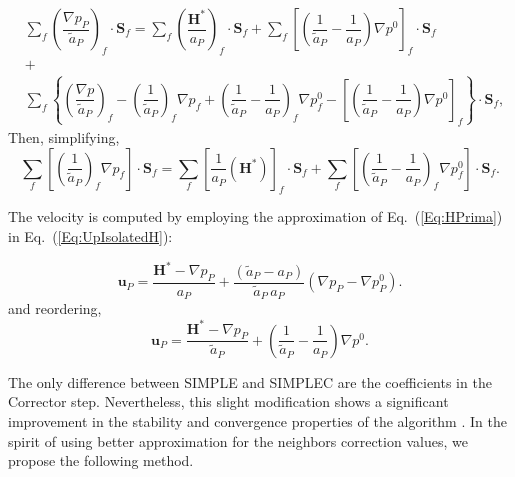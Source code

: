\documentclass[final,3p,times,11pt,onecolumn]{myElsarticle}
\numberwithin{equation}{section}
\begin{document}
\begin{equation}
\label{eq:pEqnSIMPLEC2}
\begin{array}{ccc}
&
\sum_{f} 
\left(
\dfrac
{
\nabla p_P}
{\tilde{a}_P}
\right)_f
\cdotp 
\boldsymbol{S}_{f} 
=
\sum_{f} 
\left(
\dfrac
{
\boldsymbol{H}^{*}
}
{a_P}
\right)_f
\cdotp 
\boldsymbol{S}_{f}
+
\sum_f
\left[
\left(
\dfrac{1}
{\tilde{a}_P}
-
\dfrac{1}
{a_P}
\right)
\nabla p^{0}
\right]_f
\cdot
\boldsymbol{S}_f
&
\\
&+& \\
&
\sum_f
\left\lbrace
\left(
\dfrac
{
\nabla p
}
{\tilde{a}_P}
\right)_f
-
\left(
\dfrac
{1}
{\tilde{a}_P}
\right)_f
\nabla p_f
+
\left(
\dfrac
{1}
{\tilde{a}_P}
-
\dfrac
{1}
{a_P}
\right)_f
\nabla p^{0}_f
-
\left[
\left(
\dfrac
{1}
{\tilde{a}_P}
-
\dfrac
{1}
{a_P}
\right)
\nabla p^0
\right]_f
\right\rbrace
\cdot
\boldsymbol{S}_f,
&
\end{array}
\end{equation}
Then, simplifying,
\begin{equation}
\sum_f
\left[
\left(
\dfrac
{1}
{\tilde{a}_P}
\right)_f
\nabla p_f
\right]
\cdot 
\boldsymbol{S}_f
= 
\sum_f 
\left[
\frac{1}{a_P}
\left(
\boldsymbol{H}^*
\right)
\right]_f 
\cdot
\boldsymbol{S}_f
+
\sum_f
\left[
\left(
\dfrac
{1}
{\tilde{a}_P}
-
\dfrac
{1}
{a_P}
\right)_f
\nabla p^{0}_f
\right]
\cdot
\boldsymbol{S}_f.
\label{eq:pEqnSIMPLEC}
\end{equation}

The velocity is computed by employing the approximation of Eq.~(\ref{Eq:HPrima}) in Eq.~(\ref{Eq:UpIsolatedH}):

\begin{equation}
\label{eq:uCorrSIMPLEC}
\boldsymbol{u}_P 
=
\dfrac
{
\boldsymbol{H}^*
- 
\nabla p_P}
{a_P}
+
\dfrac
{
\left(
\tilde{a}_P
-
a_P
\right)
}
{
\tilde{a}_P\,a_P
}
\left(
\nabla p_P
-
\nabla p_P^{0}
\right).
\end{equation}
and reordering,
\begin{equation}
\label{Eq:velocitySimplec}
\boldsymbol{u}_P 
=
\dfrac
{
\boldsymbol{H}^*
- 
\nabla p_P}
{\tilde{a}_P}
+
\left(
\dfrac{1}
{\tilde{a}_P}
-
\dfrac{1}
{a_P}
\right)
\nabla p^{0}.
\end{equation}


The only difference between SIMPLE and SIMPLEC are the coefficients in the Corrector step. Nevertheless, this slight modification shows a significant improvement in the stability  and convergence properties of the algorithm \cite{liu}. In the spirit of using better approximation for the neighbors correction values, we propose the following method.
\end{document}
